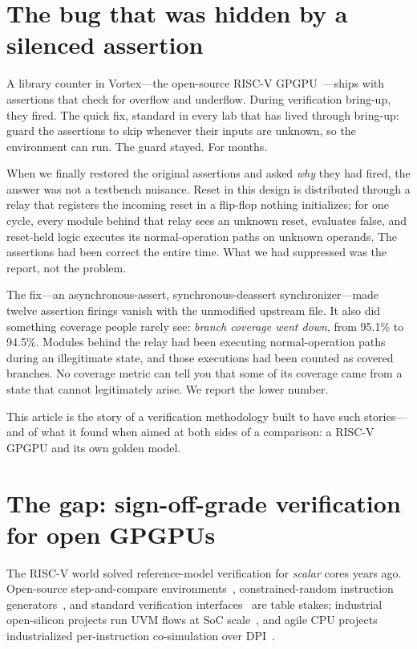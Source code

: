 \documentclass[conference]{IEEEtran}
\newcommand{\code}[1]{\texttt{\detokenize{#1}}}
\begin{document}
\section{The bug that was hidden by a silenced assertion}
A library counter in Vortex---the open-source RISC-V
GPGPU~\cite{vortex-micro}---ships with assertions that check for
overflow and underflow. During verification bring-up, they fired.
The quick fix, standard in every lab that has lived through
bring-up: guard the assertions to skip whenever their inputs are
unknown, so the environment can run. The guard stayed. For months.

When we finally restored the original assertions and asked
\emph{why} they had fired, the answer was not a testbench nuisance.
Reset in this design is distributed through a relay that registers
the incoming reset in a flip-flop nothing initializes; for one cycle,
every module behind that relay sees an unknown reset, \code{if (X)}
evaluates false, and reset-held logic executes its
normal-operation paths on unknown operands. The assertions had been
correct the entire time. What we had suppressed was the report, not
the problem.

The fix---an asynchronous-assert, synchronous-deassert
synchronizer---made twelve assertion firings vanish with the
unmodified upstream file. It also did something coverage people
rarely see: \emph{branch coverage went down}, from 95.1\% to 94.5\%.
Modules behind the relay had been executing normal-operation paths
during an illegitimate state, and those executions had been counted
as covered branches. No coverage metric can tell you that some of
its coverage came from a state that cannot legitimately arise. We
report the lower number.

This article is the story of a verification methodology built to have
such stories---and of what it found when aimed at both sides of a
comparison: a RISC-V GPGPU and its own golden model.

\section{The gap: sign-off-grade verification for open GPGPUs}
The RISC-V world solved reference-model verification for
\emph{scalar} cores years ago. Open-source step-and-compare
environments~\cite{corevverif}, constrained-random instruction
generators~\cite{riscvdv}, and standard verification
interfaces~\cite{rvvi,imperasdv} are table stakes; industrial
open-silicon projects run UVM flows at SoC scale~\cite{opentitan},
and agile CPU projects industrialized per-instruction co-simulation
over DPI~\cite{difftest}.
\end{document}

